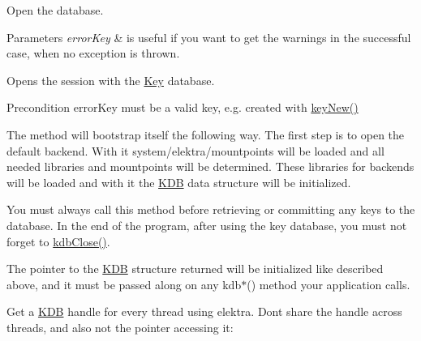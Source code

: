 Open the database. 


\begin{DoxyParams}{Parameters}
{\em error\+Key} & is useful if you want to get the warnings in the successful case, when no exception is thrown.\\
\hline
\end{DoxyParams}
Opens the session with the \hyperlink{classkdb_1_1Key}{Key} database. \begin{DoxyPrecond}{Precondition}
error\+Key must be a valid key, e.\+g. created with \hyperlink{group__key_gad23c65b44bf48d773759e1f9a4d43b89}{key\+New()}
\end{DoxyPrecond}
The method will bootstrap itself the following way. The first step is to open the default backend. With it system/elektra/mountpoints will be loaded and all needed libraries and mountpoints will be determined. These libraries for backends will be loaded and with it the {\ttfamily \hyperlink{classkdb_1_1KDB}{K\+DB}} data structure will be initialized.

You must always call this method before retrieving or committing any keys to the database. In the end of the program, after using the key database, you must not forget to \hyperlink{group__kdb_gadb54dc9fda17ee07deb9444df745c96f}{kdb\+Close()}.

The pointer to the {\ttfamily \hyperlink{classkdb_1_1KDB}{K\+DB}} structure returned will be initialized like described above, and it must be passed along on any kdb$\ast$() method your application calls.

Get a {\ttfamily \hyperlink{classkdb_1_1KDB}{K\+DB}} handle for every thread using elektra. Don\textquotesingle{}t share the handle across threads, and also not the pointer accessing it\+:


